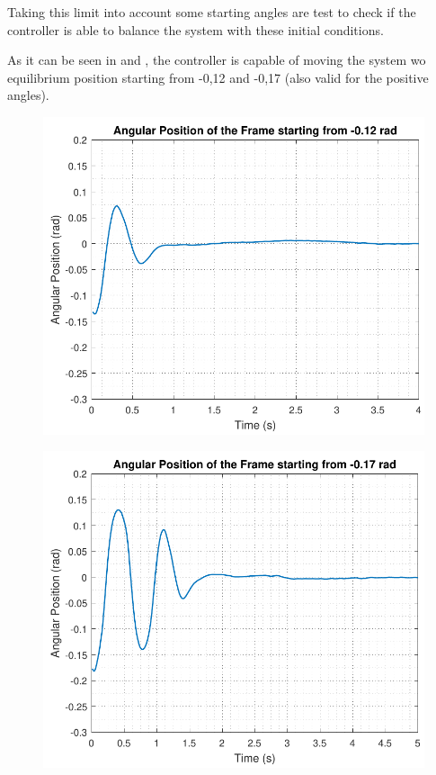 Taking this limit into account some starting angles are test to check if the controller is able to balance the system with these initial conditions. 

As it can be seen in  and , the controller is capable of moving the system wo equilibrium position starting from -0,12 and -0,17 (also valid for the positive angles).

\begin{minipage}{\linewidth}
	\begin{minipage}{0.45\linewidth}
		\begin{figure}[H]
			\includegraphics[scale=.55]{figures/testCatch_12}
			\centering
			\captionsetup{justification=centering}
			\label{testCatch_12}
		\end{figure}
	\end{minipage}
	\hspace{0.03\linewidth}
	\begin{minipage}{0.45\linewidth}
		\begin{figure}[H]\vspace{-3mm}
			\includegraphics[scale=.55]{figures/testCatch_17}

\end{figure}
\end{minipage}
\end{minipage}
